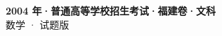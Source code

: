 \documentclass[zihao=-4, a4paper]{ctexart}
\begin{document}
\begin{center}
  {\Large\bfseries 2004 年·普通高等学校招生考试·福建卷·文科}\\[4pt]
  {\large 数学 · 试题版}
\end{center}
\medskip
{}

\end{document}
